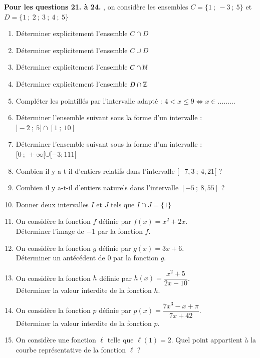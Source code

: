 \documentclass[oneside,12pt]{article}          %
\begin{document}
\textbf{Pour les questions 21. à 24.} , on considère les ensembles $C = \{ 1 ~;~ -3 ~;~ 5\}$ et $D = \{ 1 ~;~ 2 ~;~ 3 ~;~ 4 ~;~ 5 \}$
\begin{enumerate}[resume*]
	\item Déterminer explicitement l'ensemble $C \cap D$
	\item Déterminer explicitement l'ensemble $C \cup D$
	\item Déterminer explicitement l'ensemble $C \cap {\mathbb N}$
	\item Déterminer explicitement l'ensemble $D \cap {\mathbb Z}$

\smallskip
	\item Compléter les pointillés par l'intervalle adapté : $4 < x \leq 9 \iff x \in \ldots\ldots\ldots$
	\item Déterminer l'ensemble suivant sous la forme d'un intervalle : $]-2 ~;~ 5] \cap [1 ~;~ 10]$
	\item Déterminer l'ensemble suivant sous la forme d'un intervalle : $[0 ~;~ +\infty[ \cup [-3 ; 111[$
	\item Combien il y a-t-il d'entiers relatifs dans l'intervalle $[-7,3 ~;~ 4,21[$ ?
	\item Combien il y a-t-il d'entiers naturels dans l'intervalle $[-5 ~;~ 8,55]$ ?
	\item Donner deux intervalles $I$ et $J$ tels que $I \cap J = \{1\}$
	
	\item On considère la fonction $f$ définie par $f(x) = x^2 + 2x$.\\
	Déterminer l'image de $-1$ par la fonction $f$.
	\item On considère la fonction $g$ définie par $g(x) = 3x +6$.\\
	Déterminer un antécédent de $0$ par la fonction $g$.
	\item On considère la fonction $h$ définie par $h(x) = \dfrac{x^2+5}{2x-10}$.\\
	Déterminer la valeur interdite de la fonction $h$.
	\item On considère la fonction $p$ définie par $p(x) = \dfrac{7x^3 - x + \pi}{7x + 42}$.\\
	Déterminer la valeur interdite de la fonction $p$.
	\item On considère une fonction $\ell$ telle que $\ell(1) = 2$. Quel point appartient à la courbe représentative de la fonction $\ell$ ?
\end{enumerate}
	
\end{document}
